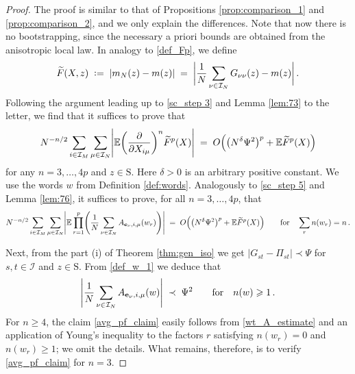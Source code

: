 \documentclass[11pt]{article} %
\newcommand{\nc}{\normalcolor}
\numberwithin{equation}{section}
\numberwithin{figure}{section}
\theoremstyle{plain} %
\theoremstyle{definition} %
\newcommand{\f}[1]{\boldsymbol{\mathrm{#1}}} %
\renewcommand{\cal}{\mathcal}
\newcommand{\wt}{\widetilde}
\newcommand{\txt}[1]{\text{\rm{#1}}}
\newcommand{\E}{\mathbb{E}}
\newcommand*{\deq}{\mathrel{\vcenter{\baselineskip0.65ex \lineskiplimit0pt \hbox{.}\hbox{.}}}=}
\renewcommand{\geq}{\geqslant}
\newcommand{\pb}[1]{\bigl({#1}\bigr)}
\newcommand{\pB}[1]{\Bigl({#1}\Bigr)}
\newcommand{\pbb}[1]{\biggl({#1}\biggr)}
\newcommand{\pBB}[1]{\Biggl({#1}\Biggr)}
\newcommand{\abs}[1]{\lvert #1 \rvert}
\newcommand{\absbb}[1]{\biggl\lvert #1 \biggr\rvert}
\newcommand{\absBB}[1]{\Biggl\lvert #1 \Biggr\rvert}
\begin{document}
\begin{proof}
The proof is similar to that of Propositions \ref{prop:comparison_1} and \ref{prop:comparison_2}, and we only explain the differences.  Note that now there is no bootstrapping, since the necessary a priori bounds are obtained from the anisotropic local law. In analogy to \eqref{def_Fp}, we define
\begin{equation*}
\wt F(X,z) \;\deq\; \abs{m_N(z) - m(z)} \;=\; \absbb{\frac{1}{N} \sum_{\nu \in \cal I_N} G_{\nu \nu}(z) - m(z)}\,.
\end{equation*}
Following the argument leading up to \eqref{sc_step 3} and Lemma \ref{lem:73} to the letter, we find that it suffices to prove that 
\begin{equation*}
N^{-n/2} \sum_{i \in \cal I_M} \sum_{\mu \in \cal I_N} \absBB{\E \pbb{\frac{\partial}{\partial X_{i \mu}}}^n \wt F^p(X)} \;=\; O \pB{\pb{N^{\delta} \Psi^2}^p+\E \wt F^p(X)}
\end{equation*}
for any $n = 3, \dots, 4p$ and $z \in \f S$. Here $\delta > 0$ is an arbitrary positive constant. We use the words $w$ from Definition \ref{def:words}.
Analogously to \eqref{sc_step 5} and Lemma \ref{lem:76}, it suffices to prove, for all $n = 3, \dots, 4p$, that
\begin{equation} \label{avg_pf_claim}
N^{-n/2} \sum_{i \in \cal I_M} \sum_{\mu \in \cal I_N} \absBB{\E \prod_{r = 1}^{p} \pBB{\frac{1}{N} \sum_{\nu \in \cal I_N} A_{\f e_\nu,i, \mu}(w_r)}}  \;=\; O \pB{\pb{N^{\delta}\Psi^2}^p+\E \wt F^p(X)} \qquad \txt{for} \quad \sum_r n(w_r) = n\,.
\end{equation}

Next, from the part (i) of Theorem \ref{thm:gen_iso} we get $\abs{G_{st} - \Pi_{st}} \prec \Psi$ for $s,t \in \cal I$ and $z \in \f S$. From \eqref{def_w_1} we deduce that
\begin{equation} \label{wt_A_estimate}
\absBB{\frac{1}{N} \sum_{\nu \in \cal I_N} A_{\f e_\nu,i, \mu}(w)} \;\prec\; \Psi^2 \qquad \txt{for} \quad n(w) \geq 1\,.
\end{equation}
For $n \geq 4$, the claim \eqref{avg_pf_claim} easily follows from \eqref{wt_A_estimate}  and an application of Young's inequality to the factors $r$ satisfying $n(w_r) = 0$ and $n(w_r) \geq 1$; we omit the details. \nc What remains, therefore, is to verify \eqref{avg_pf_claim} for $n = 3$.


\end{proof}
\end{document}
